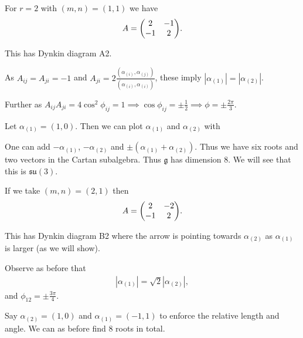 
\begin{example}
    For $r = 2$ with $\left( m,n \right) = \left( 1,1 \right) $ we have
    \begin{align}
        A = \mqty( 2 & -1 \\ -1 & 2 )
    .\end{align}
\end{example}

This has Dynkin diagram \dynkin A2.

As $A_{ij} = A_{ji} = -1$ and $A_{ji} = 2 \frac{\left( \alpha_{\left( i \right) }, \alpha_{\left( j \right) } \right) }{\left( \alpha_{\left( i \right) }, \alpha_{\left( i \right) } \right) }$, these imply $\left| \alpha_{\left( 1 \right) } \right| = \left| \alpha_{\left( 2 \right) } \right| $.

Further as $A_{ij} A_{ji} = 4 \cos^2 \phi_{ij} = 1 \implies  \cos \phi_{ij} = \pm \frac{1}{2} \implies \phi = \pm \frac{2\pi}{3}$.

Let $\alpha_{\left( 1 \right) } = \left( 1,0 \right) $. Then we can plot $\alpha_{\left( 1 \right) }$ and $\alpha_{\left( 2 \right) }$ with

One can add $-\alpha_{\left( 1 \right) }$, $-\alpha_{\left( 2 \right) }$ and $\pm \left( \alpha_{\left( 1 \right)}  + \alpha_{\left( 2 \right)}   \right) $. Thus we have six roots and two vectors in the Cartan subalgebra. Thus $\mathfrak{g}$ has dimension 8. We will see that this is $\mathfrak{su}\left( 3 \right) $.

If we take $\left( m,n \right) = \left( 2,1 \right) $ then
\begin{align}
    A = \mqty( 2 & -2 \\ -1 & 2)
.\end{align}

This has Dynkin diagram \dynkin B2 where the arrow is pointing towards $\alpha_{\left( 2 \right) }$ as $\alpha_{\left( 1 \right) }$ is larger (as we will show).

Observe as before that
\begin{align}
    \left| \alpha_{\left( 1 \right) } \right| = \sqrt{2} \left| \alpha_{\left( 2 \right) } \right| 
,\end{align}
and $\phi_{12} = \pm \frac{3\pi}{4}$.

Say $\alpha_{\left( 2 \right) } = \left( 1,0 \right) $ and $\alpha_{\left( 1 \right) } = \left( -1,1 \right) $ to enforce the relative length and angle. We can as before find 8 roots in total.

